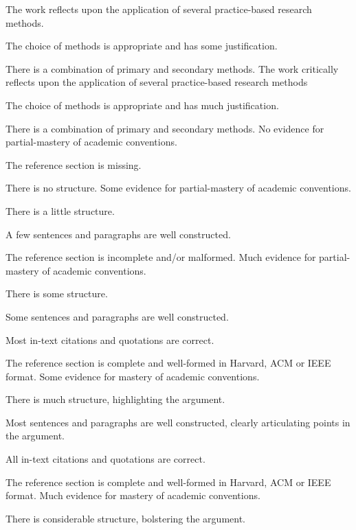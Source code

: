 \documentclass{../../fal_assignment}
\begin{document}
\begin{markingrubric}
        \grade The work reflects upon the application of several practice-based research methods.
            \par The choice of methods is appropriate and has some justification.
            \par There is a combination of primary and secondary methods.
        \grade The work critically reflects upon the application of several practice-based research methods 
            \par The choice of methods is appropriate and has much justification.
            \par There is a combination of primary and secondary methods.
%
        \grade\fail No evidence for partial-mastery of academic conventions.
        \par The reference section is missing.
        \par There is no structure.
        \grade 	Some evidence for partial-mastery of academic conventions.
            \par There is a little structure.
            \par A few sentences and paragraphs are well constructed.
            \par 	The reference section is incomplete and/or malformed.
        \grade Much evidence for partial-mastery of academic conventions.
        \par There is some structure.
            \par Some sentences and paragraphs are well constructed.
        \par Most in-text citations and quotations are correct.
        \par The reference section is complete and well-formed in Harvard, ACM or IEEE format.
        \grade Some evidence for mastery of academic conventions.
            \par There is much structure, highlighting the argument.
            \par Most sentences and paragraphs are well constructed, clearly articulating points in the argument.
        \par All in-text citations and quotations are correct.
        \par The reference section is complete and well-formed in Harvard, ACM or IEEE format.
        \grade 	Much evidence for mastery of academic conventions.
            \par There is considerable structure, bolstering the argument.

\end{markingrubric}
\end{document}
